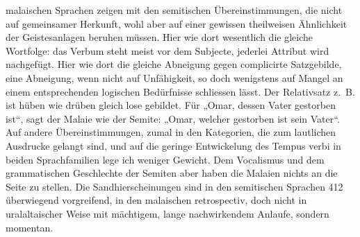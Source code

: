  malaischen Sprachen zeigen mit den semitischen Übereinstimmungen, die nicht auf gemeinsamer Herkunft, wohl aber auf einer gewissen theilweisen Ähnlichkeit der Geistesanlagen beruhen müssen. Hier wie dort wesentlich die gleiche Wortfolge: das Verbum steht meist vor dem Subjecte, jederlei Attribut wird nachgefügt. Hier wie dort die gleiche Abneigung gegen complicirte Satzgebilde, eine Abneigung,  wenn nicht auf Unfähigkeit, so doch wenigstens auf Mangel an einem entsprechenden logischen Bedürfnisse schliessen lässt. Der Relativsatz z.~B. ist hüben wie drüben gleich lose gebildet. Für „Omar, dessen Vater gestorben ist“, sagt der Malaie wie der Semite: „Omar, welcher gestorben ist sein Vater“. Auf andere Übereinstimmungen, zumal in den Kategorien, die zum lautlichen Ausdrucke gelangt sind, und auf die geringe Entwickelung des Tempus verbi in beiden Sprachfamilien lege ich weniger Gewicht. Dem Vocalismus und dem grammatischen Geschlechte der Semiten aber haben die Malaien nichts an die Seite zu stellen. Die Sandhierscheinungen sind in den semitischen Sprachen {\textbar}{\textbar}412{\textbar}{\textbar} überwiegend vorgreifend, in den malaischen retrospectiv, doch nicht in uralaltaischer Weise mit mächtigem, lange nachwirkendem Anlaufe, sondern momentan.

